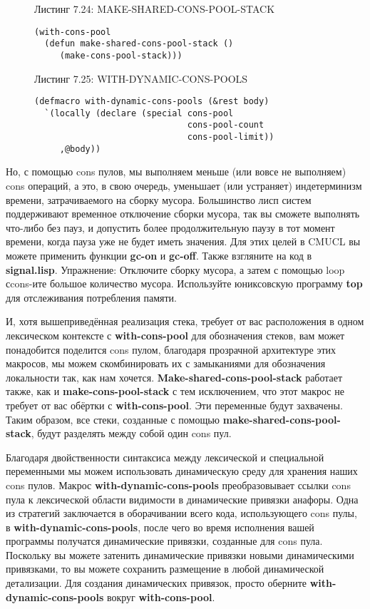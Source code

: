 \begin{figure}Листинг 7.24: MAKE-SHARED-CONS-POOL-STACK\label{listing_7.24}
\listbegin
\begin{verbatim}
(with-cons-pool
  (defun make-shared-cons-pool-stack ()
     (make-cons-pool-stack)))
\end{verbatim}
\listend
\end{figure}

\begin{figure}Листинг 7.25: WITH-DYNAMIC-CONS-POOLS\label{listing_7.25}
\listbegin
\begin{verbatim}
(defmacro with-dynamic-cons-pools (&rest body)
  `(locally (declare (special cons-pool
                              cons-pool-count
                              cons-pool-limit))
     ,@body))
\end{verbatim}
\listend
\end{figure}

Но, с помощью cons пулов, мы выполняем меньше (или вовсе не выполняем) cons операций, а это, в свою очередь, уменьшает (или устраняет) индетерминизм времени, затрачиваемого на сборку мусора. Большинство лисп систем поддерживают временное отключение сборки мусора, так вы сможете выполнять что-либо без пауз, и допустить более продолжительную паузу в тот момент времени, когда пауза уже не будет иметь значения. Для этих целей в CMUCL вы можете применить функции \textbf{gc-on} и \textbf{gc-off}. Также взгляните на код в \textbf{signal.lisp}. Упражнение: Отключите сборку мусора, а затем с помощью loop сcons-ите большое количество мусора. Используйте юниксовскую программу \textbf{top} для отслеживания потребления памяти.

И, хотя вышеприведённая реализация стека, требует от вас расположения в одном лексическом контексте с \textbf{with-cons-pool} для обозначения стеков, вам может понадобится поделится cons пулом, благодаря прозрачной архитектуре этих макросов, мы можем скомбинировать их с замыканиями для обозначения локальности так, как нам хочется. \textbf{Make-shared-cons-pool-stack} работает также, как и \textbf{make-cons-pool-stack} с тем исключением, что этот макрос не требует от вас обёртки с \textbf{with-cons-pool}. Эти переменные будут захвачены. Таким образом, все стеки, созданные с помощью \textbf{make-shared-cons-pool-stack}, будут разделять между собой один cons пул.

Благодаря двойственности синтаксиса между лексической и специальной переменными мы можем использовать динамическую среду для хранения наших cons пулов. Макрос \textbf{with-dynamic-cons-pools} преобразовывает ссылки cons пула к лексической области видимости в динамические привязки анафоры. Одна из стратегий заключается в оборачивании всего кода, использующего cons пулы, в \textbf{with-dynamic-cons-pools}, после чего во время исполнения вашей программы получатся динамические привязки, созданные для cons пула. Поскольку вы можете затенить динамические привязки новыми динамическими привязками, то вы можете сохранить размещение в любой динамической детализации. Для создания динамических привязок, просто оберните \textbf{with-dynamic-cons-pools} вокруг \textbf{with-cons-pool}.

